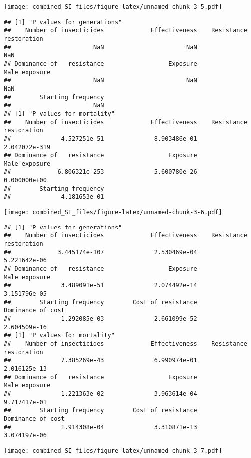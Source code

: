 \documentclass[
]{article}
\begin{document}
\texttt{[image: combined\_SI\_files/figure-latex/unnamed-chunk-3-5.pdf]}

\begin{verbatim}
## [1] "P values for generations"
##    Number of insecticides             Effectiveness    Resistance restoration 
##                       NaN                       NaN                       NaN 
## Dominance of   resistance                  Exposure             Male exposure 
##                       NaN                       NaN                       NaN 
##        Starting frequency 
##                       NaN 
## [1] "P values for mortality"
##    Number of insecticides             Effectiveness    Resistance restoration 
##              4.527251e-51              8.903486e-01             2.042072e-319 
## Dominance of   resistance                  Exposure             Male exposure 
##             6.806321e-253              5.600780e-26              0.000000e+00 
##        Starting frequency 
##              4.181653e-01
\end{verbatim}

\texttt{[image: combined\_SI\_files/figure-latex/unnamed-chunk-3-6.pdf]}

\begin{verbatim}
## [1] "P values for generations"
##    Number of insecticides             Effectiveness    Resistance restoration 
##             3.445174e-107              2.530469e-04              5.221642e-06 
## Dominance of   resistance                  Exposure             Male exposure 
##              3.489091e-51              2.074492e-14              3.151796e-05 
##        Starting frequency        Cost of resistance         Dominance of cost 
##              1.292085e-03              2.661099e-52              2.604509e-16 
## [1] "P values for mortality"
##    Number of insecticides             Effectiveness    Resistance restoration 
##              7.385269e-43              6.990974e-01              2.016125e-13 
## Dominance of   resistance                  Exposure             Male exposure 
##              1.221363e-02              3.963614e-04              9.717417e-01 
##        Starting frequency        Cost of resistance         Dominance of cost 
##              1.914308e-04              3.310871e-13              3.074197e-06
\end{verbatim}

\texttt{[image: combined\_SI\_files/figure-latex/unnamed-chunk-3-7.pdf]}
\end{document}
